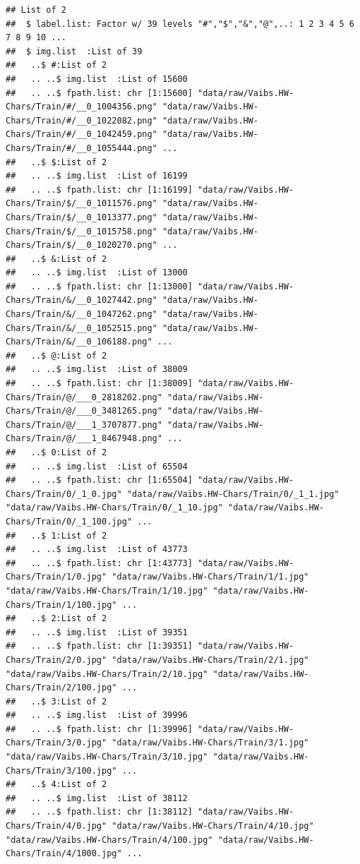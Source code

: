 \documentclass[
]{report}
\begin{document}
\begin{verbatim}
## List of 2
##  $ label.list: Factor w/ 39 levels "#","$","&","@",..: 1 2 3 4 5 6 7 8 9 10 ...
##  $ img.list  :List of 39
##   ..$ #:List of 2
##   .. ..$ img.list  :List of 15600
##   .. ..$ fpath.list: chr [1:15600] "data/raw/Vaibs.HW-Chars/Train/#/__0_1004356.png" "data/raw/Vaibs.HW-Chars/Train/#/__0_1022082.png" "data/raw/Vaibs.HW-Chars/Train/#/__0_1042459.png" "data/raw/Vaibs.HW-Chars/Train/#/__0_1055444.png" ...
##   ..$ $:List of 2
##   .. ..$ img.list  :List of 16199
##   .. ..$ fpath.list: chr [1:16199] "data/raw/Vaibs.HW-Chars/Train/$/__0_1011576.png" "data/raw/Vaibs.HW-Chars/Train/$/__0_1013377.png" "data/raw/Vaibs.HW-Chars/Train/$/__0_1015758.png" "data/raw/Vaibs.HW-Chars/Train/$/__0_1020270.png" ...
##   ..$ &:List of 2
##   .. ..$ img.list  :List of 13000
##   .. ..$ fpath.list: chr [1:13000] "data/raw/Vaibs.HW-Chars/Train/&/__0_1027442.png" "data/raw/Vaibs.HW-Chars/Train/&/__0_1047262.png" "data/raw/Vaibs.HW-Chars/Train/&/__0_1052515.png" "data/raw/Vaibs.HW-Chars/Train/&/__0_106188.png" ...
##   ..$ @:List of 2
##   .. ..$ img.list  :List of 38009
##   .. ..$ fpath.list: chr [1:38009] "data/raw/Vaibs.HW-Chars/Train/@/___0_2818202.png" "data/raw/Vaibs.HW-Chars/Train/@/___0_3481265.png" "data/raw/Vaibs.HW-Chars/Train/@/___1_3707877.png" "data/raw/Vaibs.HW-Chars/Train/@/___1_8467948.png" ...
##   ..$ 0:List of 2
##   .. ..$ img.list  :List of 65504
##   .. ..$ fpath.list: chr [1:65504] "data/raw/Vaibs.HW-Chars/Train/0/_1_0.jpg" "data/raw/Vaibs.HW-Chars/Train/0/_1_1.jpg" "data/raw/Vaibs.HW-Chars/Train/0/_1_10.jpg" "data/raw/Vaibs.HW-Chars/Train/0/_1_100.jpg" ...
##   ..$ 1:List of 2
##   .. ..$ img.list  :List of 43773
##   .. ..$ fpath.list: chr [1:43773] "data/raw/Vaibs.HW-Chars/Train/1/0.jpg" "data/raw/Vaibs.HW-Chars/Train/1/1.jpg" "data/raw/Vaibs.HW-Chars/Train/1/10.jpg" "data/raw/Vaibs.HW-Chars/Train/1/100.jpg" ...
##   ..$ 2:List of 2
##   .. ..$ img.list  :List of 39351
##   .. ..$ fpath.list: chr [1:39351] "data/raw/Vaibs.HW-Chars/Train/2/0.jpg" "data/raw/Vaibs.HW-Chars/Train/2/1.jpg" "data/raw/Vaibs.HW-Chars/Train/2/10.jpg" "data/raw/Vaibs.HW-Chars/Train/2/100.jpg" ...
##   ..$ 3:List of 2
##   .. ..$ img.list  :List of 39996
##   .. ..$ fpath.list: chr [1:39996] "data/raw/Vaibs.HW-Chars/Train/3/0.jpg" "data/raw/Vaibs.HW-Chars/Train/3/1.jpg" "data/raw/Vaibs.HW-Chars/Train/3/10.jpg" "data/raw/Vaibs.HW-Chars/Train/3/100.jpg" ...
##   ..$ 4:List of 2
##   .. ..$ img.list  :List of 38112
##   .. ..$ fpath.list: chr [1:38112] "data/raw/Vaibs.HW-Chars/Train/4/0.jpg" "data/raw/Vaibs.HW-Chars/Train/4/10.jpg" "data/raw/Vaibs.HW-Chars/Train/4/100.jpg" "data/raw/Vaibs.HW-Chars/Train/4/1000.jpg" ...

\end{verbatim}
\end{document}
